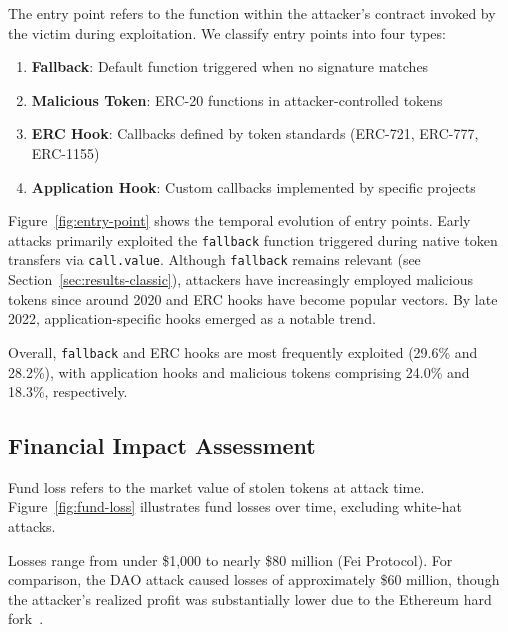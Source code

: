 The entry point refers to the function within the attacker's contract invoked by the victim during exploitation. We classify entry points into four types:

\begin{enumerate}
    \item \textbf{Fallback}: Default function triggered when no signature matches
    \item \textbf{Malicious Token}: ERC-20 functions in attacker-controlled tokens
    \item \textbf{ERC Hook}: Callbacks defined by token standards (ERC-721, ERC-777, ERC-1155)
    \item \textbf{Application Hook}: Custom callbacks implemented by specific projects
\end{enumerate}

Figure~\ref{fig:entry-point} shows the temporal evolution of entry points. Early attacks primarily exploited the \lstinline{fallback} function triggered during native token transfers via \lstinline{call.value}. Although \lstinline{fallback} remains relevant (see Section~\ref{sec:results-classic}), attackers have increasingly employed malicious tokens since around 2020 and ERC hooks have become popular vectors. By late 2022, application-specific hooks emerged as a notable trend.

Overall, \lstinline{fallback} and ERC hooks are most frequently exploited (29.6\% and 28.2\%), with application hooks and malicious tokens comprising 24.0\% and 18.3\%, respectively.



\subsection{Financial Impact Assessment}
\label{sec:results-financial}

Fund loss refers to the market value of stolen tokens at attack time. Figure~\ref{fig:fund-loss} illustrates fund losses over time, excluding white-hat attacks.

Losses range from under \$1,000 to nearly \$80 million (Fei Protocol). For comparison, the DAO attack caused losses of approximately \$60 million, though the attacker's realized profit was substantially lower due to the Ethereum hard fork~\cite{the-dao-analysis}.

